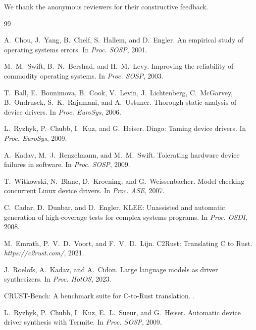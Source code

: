 \documentclass[sigplan, screen, review, anonymous]{acmart}
\begin{document}
\begin{acks}
We thank the anonymous reviewers for their constructive feedback.
\end{acks}


\begin{thebibliography}{99}

A.~Chou, J.~Yang, B.~Chelf, S.~Hallem, and D.~Engler.
\newblock An empirical study of operating systems errors.
\newblock In \emph{Proc. SOSP}, 2001.

M.~M.~Swift, B.~N.~Bershad, and H.~M.~Levy.
\newblock Improving the reliability of commodity operating systems.
\newblock In \emph{Proc. SOSP}, 2003.

T.~Ball, E.~Bounimova, B.~Cook, V.~Levin, J.~Lichtenberg, C.~McGarvey, B.~Ondrusek, S.~K.~Rajamani, and A.~Ustuner.
\newblock Thorough static analysis of device drivers.
\newblock In \emph{Proc. EuroSys}, 2006.

L.~Ryzhyk, P.~Chubb, I.~Kuz, and G.~Heiser.
\newblock Dingo: Taming device drivers.
\newblock In \emph{Proc. EuroSys}, 2009.

A.~Kadav, M.~J.~Renzelmann, and M.~M.~Swift.
\newblock Tolerating hardware device failures in software.
\newblock In \emph{Proc. SOSP}, 2009.

T.~Witkowski, N.~Blanc, D.~Kroening, and G.~Weissenbacher.
\newblock Model checking concurrent Linux device drivers.
\newblock In \emph{Proc. ASE}, 2007.

C.~Cadar, D.~Dunbar, and D.~Engler.
\newblock KLEE: Unassisted and automatic generation of high-coverage tests for complex systems programs.
\newblock In \emph{Proc. OSDI}, 2008.

M.~Emrath, P.~V.~D.~Voort, and F.~V.~D.~Lijn.
\newblock C2Rust: Translating C to Rust.
\newblock \emph{https://c2rust.com/}, 2021.

J.~Roelofs, A.~Kadav, and A.~Cidon.
\newblock Large language models as driver synthesizers.
\newblock In \emph{Proc. HotOS}, 2023.

\newblock CRUST-Bench: A benchmark suite for C-to-Rust translation.
.

L.~Ryzhyk, P.~Chubb, I.~Kuz, E.~L.~Sueur, and G.~Heiser.
\newblock Automatic device driver synthesis with Termite.
\newblock In \emph{Proc. SOSP}, 2009.


\end{thebibliography}
\end{document}

